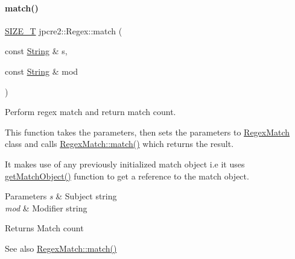 \paragraph{\texorpdfstring{match()}{match()}\hspace{0.1cm}{\footnotesize\ttfamily [1/2]}}
{\footnotesize\ttfamily \hyperlink{namespacejpcre2_a2aac465ddcb123560c7c8215dd69246c}{S\+I\+Z\+E\+\_\+T} jpcre2\+::\+Regex\+::match (\begin{DoxyParamCaption}\item[{const \hyperlink{namespacejpcre2_a91f03070152fb228bc116c5a737f1d16}{String} \&}]{s,  }\item[{const \hyperlink{namespacejpcre2_a91f03070152fb228bc116c5a737f1d16}{String} \&}]{mod }\end{DoxyParamCaption})\hspace{0.3cm}{\ttfamily [inline]}}



Perform regex match and return match count. 

This function takes the parameters, then sets the parameters to \hyperlink{classjpcre2_1_1RegexMatch}{Regex\+Match} class and calls \hyperlink{classjpcre2_1_1RegexMatch_a5868aef3a146594ea1ebef34d122bb33_a5868aef3a146594ea1ebef34d122bb33}{Regex\+Match\+::match()} which returns the result.

It makes use of any previously initialized match object i.\+e it uses \hyperlink{classjpcre2_1_1Regex_abb007e99d7e2188ec80b741e7b40668f_abb007e99d7e2188ec80b741e7b40668f}{get\+Match\+Object()} function to get a reference to the match object. 
\begin{DoxyParams}{Parameters}
{\em s} & Subject string \\
\hline
{\em mod} & Modifier string \\
\hline
\end{DoxyParams}
\begin{DoxyReturn}{Returns}
Match count 
\end{DoxyReturn}
\begin{DoxySeeAlso}{See also}
\hyperlink{classjpcre2_1_1RegexMatch_a5868aef3a146594ea1ebef34d122bb33_a5868aef3a146594ea1ebef34d122bb33}{Regex\+Match\+::match()} 
\end{DoxySeeAlso}
\hypertarget{classjpcre2_1_1Regex_a9ffbb6aa54cb97125f1b4211bc1d09a5_a9ffbb6aa54cb97125f1b4211bc1d09a5}{}\label{classjpcre2_1_1Regex_a9ffbb6aa54cb97125f1b4211bc1d09a5_a9ffbb6aa54cb97125f1b4211bc1d09a5} 
